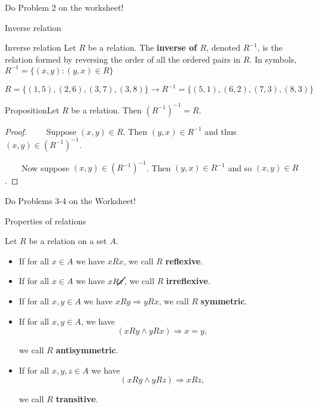 \documentclass{beamer}
\def\bl[#1]#2{\begin{block}{#1}#2\end{block}}
\def\itemb{\begin{itemize}}
\def\iteme{\end{itemize}}
\begin{document}
\begin{frame}
\begin{center}
Do Problem 2 on the worksheet!
\end{center}
\end{frame}

\begin{frame}{Inverse relation}
\bl[Inverse relation]{
Let $R$ be a relation. The \textbf{inverse of $R$}, denoted $R^{-1}$, is the relation formed by reversing the order of all the ordered pairs in $R$. In symbols, $R^{-1}=\{(x,y): (y,x)\in R\}$}\vspace{-0.5cm}
\[
R=\{(1,5),(2,6),(3,7),(3,8)\}\to R^{-1}=\{(5,1), (6,2), (7,3), (8,3)\}
\]\vspace{-0.5cm}
\bl[Proposition]{Let $R$ be a relation. Then $(R^{-1})^{-1}=R$.}
\begin{proof}
~~~~Suppose $(x,y)\in R$. Then $(y,x)\in R^{-1}$ and thus $(x,y)\in (R^{-1})^{-1}$.

~~~~Now suppose $(x,y)\in (R^{-1})^{-1}$. Then $(y,x)\in R^{-1}$ and so $(x,y)\in R$.\qedhere
\end{proof}

\end{frame}

\begin{frame}
\begin{center}
Do Problems 3-4 on the Worksheet!
\end{center}
\end{frame}

\begin{frame}{Properties of relations}
\begin{definition}
Let $R$ be a relation on a set $A$.
\itemb
\item If for all $x\in A$ we have $x R x$, we call $R$ \textbf{reflexive}.
\item If for all $x\in A$ we have $x\cancel{R} x$, we call $R$ \textbf{irreflexive}.
\item If for all $x,y\in A$ we have $xRy\Rightarrow y R x$, we call $R$ \textbf{symmetric}.
\item If for all $x,y\in A$, we have\vspace{-0.2cm}
\[
(x R y\wedge y R x)\Rightarrow x=y,
\]

\vspace{-0.2cm}we call $R$ \textbf{antisymmetric}.
\item If for all $x,y,z\in A$ we have\vspace{-0.2cm}
\[
(x R y\wedge y R z)\Rightarrow x R z,
\]

\vspace{-0.2cm}we call $R$ \textbf{transitive}.
\iteme
\end{definition}
\end{frame}
\end{document}
